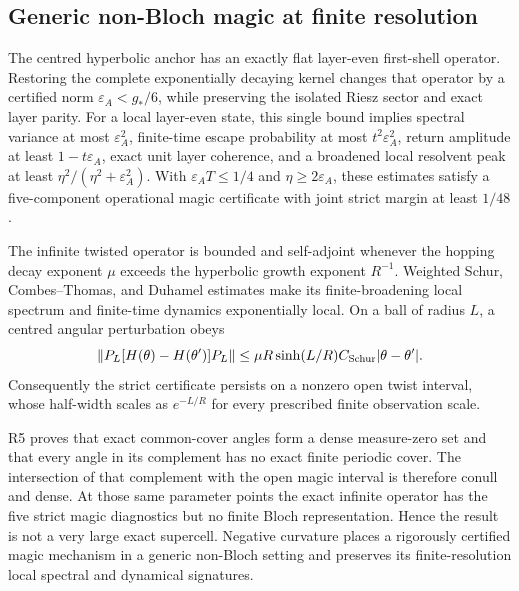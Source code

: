 \subsection{Generic non-Bloch magic at finite resolution}

The centred hyperbolic anchor has an exactly flat layer-even first-shell
operator.  Restoring the complete exponentially decaying kernel changes that
operator by a certified norm $\varepsilon_A<g_*/6$, while preserving the
isolated Riesz sector and exact layer parity.  For a local layer-even state,
this single bound implies spectral variance at most $\varepsilon_A^2$,
finite-time escape probability at most $t^2\varepsilon_A^2$, return amplitude
at least $1-t\varepsilon_A$, exact unit layer coherence, and a broadened local
resolvent peak at least
$\eta^2/(\eta^2+\varepsilon_A^2)$.  With
$\varepsilon_AT\le1/4$ and $\eta\ge2\varepsilon_A$, these estimates satisfy a
five-component operational magic certificate with joint strict margin at
least $1/48$.

The infinite twisted operator is bounded and self-adjoint whenever the hopping
decay exponent $\mu$ exceeds the hyperbolic growth exponent $R^{-1}$.  Weighted
Schur, Combes--Thomas, and Duhamel estimates make its finite-broadening local
spectrum and finite-time dynamics exponentially local.  On a ball of radius
$L$, a centred angular perturbation obeys
\begin{equation}
 \|P_L[H(\theta)-H(\theta')]P_L\|
 \le \mu R\sinh(L/R)C_{\rm Schur}|\theta-\theta'|.
\end{equation}
Consequently the strict certificate persists on a nonzero open twist interval,
whose half-width scales as $e^{-L/R}$ for every prescribed finite observation
scale.

R5 proves that exact common-cover angles form a dense measure-zero set and
that every angle in its complement has no exact finite periodic cover.  The
intersection of that complement with the open magic interval is therefore
conull and dense.  At those same parameter points the exact infinite operator
has the five strict magic diagnostics but no finite Bloch representation.
Hence the result is not a very large exact supercell.  Negative curvature
places a rigorously certified magic mechanism in a generic non-Bloch setting
and preserves its finite-resolution local spectral and dynamical signatures.
